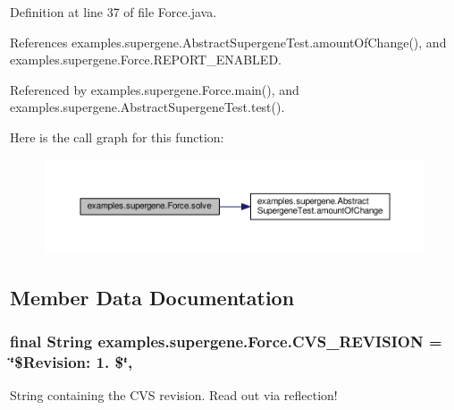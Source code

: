 Definition at line 37 of file Force.\-java.



References examples.\-supergene.\-Abstract\-Supergene\-Test.\-amount\-Of\-Change(), and examples.\-supergene.\-Force.\-R\-E\-P\-O\-R\-T\-\_\-\-E\-N\-A\-B\-L\-E\-D.



Referenced by examples.\-supergene.\-Force.\-main(), and examples.\-supergene.\-Abstract\-Supergene\-Test.\-test().



Here is the call graph for this function\-:
\nopagebreak
\begin{figure}[H]
\begin{center}
\leavevmode
\includegraphics[width=350pt]{classexamples_1_1supergene_1_1_force_a258314b6f36e5440651b3f4521a8e4bf_cgraph}
\end{center}
\end{figure}




\subsection{Member Data Documentation}
\hypertarget{classexamples_1_1supergene_1_1_force_a45d7e2ec1456b983d9f67e3ca925fd06}{
\subsubsection[{C\-V\-S\-\_\-\-R\-E\-V\-I\-S\-I\-O\-N}]{\setlength{\rightskip}{0pt plus 5cm}final String examples.\-supergene.\-Force.\-C\-V\-S\-\_\-\-R\-E\-V\-I\-S\-I\-O\-N = \char`\"{}\$Revision\-: 1. \$\char`\"{}\hspace{0.3cm}{\ttfamily [static]}, {\ttfamily [private]}}}\label{classexamples_1_1supergene_1_1_force_a45d7e2ec1456b983d9f67e3ca925fd06}
String containing the C\-V\-S revision. Read out via reflection! 

